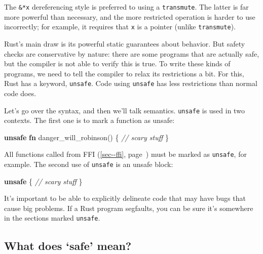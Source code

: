 \documentclass[a4paper,]{book}
\renewcommand*{\hyperref}[2][\ar]{%
  \def\ar{#2}%
  #2 (\autoref{#1}, page~\pageref{#1})}
\newenvironment{Shaded}{\begin{snugshade}}{\end{snugshade}}
\newcommand{\KeywordTok}[1]{\textcolor[rgb]{0.13,0.29,0.53}{\textbf{{#1}}}}
\newcommand{\CommentTok}[1]{\textcolor[rgb]{0.56,0.35,0.01}{\textit{{#1}}}}
\newcommand{\NormalTok}[1]{{#1}}
\begin{document}
The \texttt{\&*x} dereferencing style is preferred to using a
\texttt{transmute}. The latter is far more powerful than necessary, and
the more restricted operation is harder to use incorrectly; for example,
it requires that \texttt{x} is a pointer (unlike \texttt{transmute}).


Rust's main draw is its powerful static guarantees about behavior. But
safety checks are conservative by nature: there are some programs that
are actually safe, but the compiler is not able to verify this is true.
To write these kinds of programs, we need to tell the compiler to relax
its restrictions a bit. For this, Rust has a keyword, \texttt{unsafe}.
Code using \texttt{unsafe} has less restrictions than normal code does.

Let's go over the syntax, and then we'll talk semantics. \texttt{unsafe}
is used in two contexts. The first one is to mark a function as unsafe:

\begin{Shaded}
\begin{Highlighting}[]
\KeywordTok{unsafe} \KeywordTok{fn} \NormalTok{danger_will_robinson() \{}
    \CommentTok{// scary stuff }
\NormalTok{\}}
\end{Highlighting}
\end{Shaded}

All functions called from \hyperref[sec--ffi]{FFI} must be marked as
\texttt{unsafe}, for example. The second use of \texttt{unsafe} is an
unsafe block:

\begin{Shaded}
\begin{Highlighting}[]
\KeywordTok{unsafe} \NormalTok{\{}
    \CommentTok{// scary stuff}
\NormalTok{\}}
\end{Highlighting}
\end{Shaded}

It's important to be able to explicitly delineate code that may have
bugs that cause big problems. If a Rust program segfaults, you can be
sure it's somewhere in the sections marked \texttt{unsafe}.

\subsection{\texorpdfstring{What does `safe'
mean?}{What does safe mean?}}\label{what-does-safe-mean}
\end{document}

